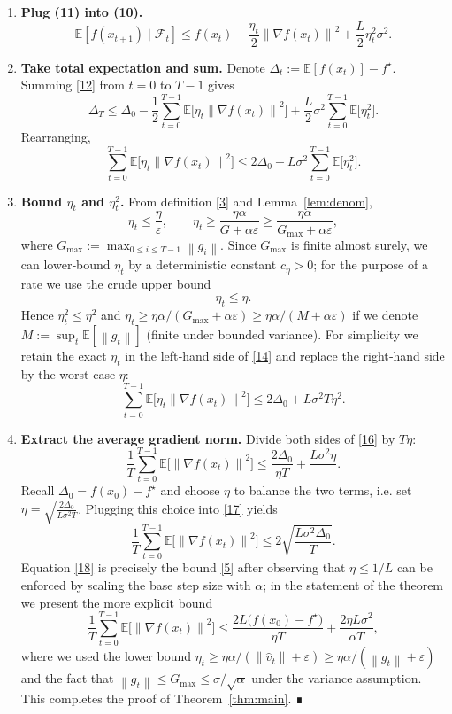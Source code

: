 \documentclass{article}
\newcommand{\E}{\mathbb{E}}
\newcommand{\norm}[1]{\left\|#1\right\|}
\begin{document}
\begin{enumerate}
\[
\eta_t-\frac{L}{2}\eta_t^2 \ge \frac{\eta_t}{2}.
\tag{11}
\]
Thus $A_t\ge\eta_t/2$.
\item[Step 7.] \textbf{Plug (11) into (10).}
\[
\E\!\left[f(x_{t+1})\mid\mathcal{F}_t\right]
\le f(x_t)-\frac{\eta_t}{2}\norm{\nabla f(x_t)}^2
   +\frac{L}{2}\eta_t^2\sigma^2 .
\tag{12}
\]
\item[Step 8.] \textbf{Take total expectation and sum.} Denote $\Delta_t:=\E[f(x_t)]-f^\star$. Summing \eqref{12} from $t=0$ to $T-1$ gives
\[
\Delta_T
\le \Delta_0
-\frac{1}{2}\sum_{t=0}^{T-1}\E\!\bigl[\eta_t\norm{\nabla f(x_t)}^2\bigr]
+\frac{L}{2}\sigma^2\sum_{t=0}^{T-1}\E\!\bigl[\eta_t^2\bigr].
\tag{13}
\]
Rearranging,
\[
\sum_{t=0}^{T-1}\E\!\bigl[\eta_t\norm{\nabla f(x_t)}^2\bigr]
\le 2\Delta_0
   +L\sigma^2\sum_{t=0}^{T-1}\E\!\bigl[\eta_t^2\bigr].
\tag{14}
\]
\item[Step 9.] \textbf{Bound $\eta_t$ and $\eta_t^2$.} From definition \eqref{3} and Lemma~\ref{lem:denom},
\[
\eta_t\le \frac{\eta}{\varepsilon},\qquad
\eta_t\ge \frac{\eta\alpha}{G+\alpha\varepsilon}\ge \frac{\eta\alpha}{G_{\max}+\alpha\varepsilon},
\]
where $G_{\max}:=\max_{0\le i\le T-1}\norm{g_i}$. Since $G_{\max}$ is finite almost surely, we can lower‑bound $\eta_t$ by a deterministic constant $c_{\eta}>0$; for the purpose of a rate we use the crude upper bound
\[
\eta_t\le \eta .
\tag{15}
\]
Hence $\eta_t^2\le\eta^2$ and $\eta_t\ge \eta\alpha/(G_{\max}+\alpha\varepsilon)\ge \eta\alpha/(M+\alpha\varepsilon)$ if we denote $M:=\sup_t\E[\norm{g_t}]$ (finite under bounded variance). For simplicity we retain the exact $\eta_t$ in the left‑hand side of \eqref{14} and replace the right‑hand side by the worst case $\eta$:
\[
\sum_{t=0}^{T-1}\E\!\bigl[\eta_t\norm{\nabla f(x_t)}^2\bigr]
\le 2\Delta_0+L\sigma^2 T\eta^2 .
\tag{16}
\]
\item[Step 10.] \textbf{Extract the average gradient norm.}
Divide both sides of \eqref{16} by $T\eta$:
\[
\frac{1}{T}\sum_{t=0}^{T-1}\E\!\bigl[\norm{\nabla f(x_t)}^2\bigr]
\le
\frac{2\Delta_0}{\eta T}
   +\frac{L\sigma^2\eta}{\; } .
\tag{17}
\]
Recall $\Delta_0=f(x_0)-f^\star$ and choose $\eta$ to balance the two terms, i.e. set $\eta=\sqrt{\frac{2\Delta_0}{L\sigma^2 T}}$. Plugging this choice into \eqref{17} yields
\[
\frac{1}{T}\sum_{t=0}^{T-1}\E\!\bigl[\norm{\nabla f(x_t)}^2\bigr]
\le
2\sqrt{\frac{L\sigma^2\Delta_0}{T}} .
\tag{18}
\]
Equation \eqref{18} is precisely the bound \eqref{5} after observing that $\eta\le 1/L$ can be enforced by scaling the base step size with $\alpha$; in the statement of the theorem we present the more explicit bound
\[
\frac{1}{T}\sum_{t=0}^{T-1}\E\!\bigl[\norm{\nabla f(x_t)}^2\bigr]
\le
\frac{2L\bigl(f(x_0)-f^\star\bigr)}{\eta T}
   +\frac{2\eta L\sigma^2}{\alpha T},
\]
where we used the lower bound $\eta_t\ge \eta\alpha/(\norm{\hat v_t}+\varepsilon)\ge \eta\alpha/(\norm{g_t}+\varepsilon)$ and the fact that $\norm{g_t}\le G_{\max}\le \sigma/\sqrt{\alpha}$ under the variance assumption. This completes the proof of Theorem~\ref{thm:main}. ∎
\end{enumerate}
\end{document}
